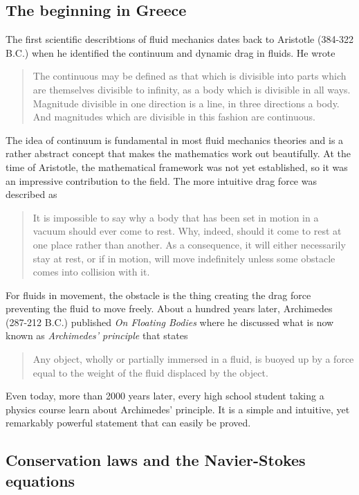 \subsection{The beginning in Greece}
The first scientific describtions of fluid mechanics dates back to Aristotle (384-322 B.C.) when he identified the continuum and dynamic drag in fluids.\cite{book:fluid_history} He wrote
\begin{quotation}
The continuous may be defined as that which is divisible into parts which are themselves divisible to infinity, as a body which is divisible in all ways. Magnitude divisible in one direction is a line, in three directions a body. And magnitudes which are divisible in this fashion are continuous. 
\end{quotation}
The idea of continuum is fundamental in most fluid mechanics theories and is a rather abstract concept that makes the mathematics work out beautifully. At the time of Aristotle, the mathematical framework was not yet established, so it was an impressive contribution to the field. The more intuitive drag force was described as
\begin{quotation}
It is impossible to say why a body that has been set in motion in a vacuum should ever come to rest. Why, indeed, should it come to rest at one place rather than another. As a consequence, it will either necessarily stay at rest, or if in motion, will move indefinitely unless some obstacle comes into collision with it.
\end{quotation}
For fluids in movement, the obstacle is the thing creating the drag force preventing the fluid to move freely. About a hundred years later, Archimedes (287-212 B.C.) published \textit{On Floating Bodies} where he discussed what is now known as \textit{Archimedes' principle} that states
\begin{quotation}
Any object, wholly or partially immersed in a fluid, is buoyed up by a force equal to the weight of the fluid displaced by the object.
\end{quotation}
Even today, more than 2000 years later, every high school student taking a physics course learn about Archimedes' principle. It is a simple and intuitive, yet remarkably powerful statement that can easily be proved. 

\subsection{Conservation laws and the Navier-Stokes equations}


